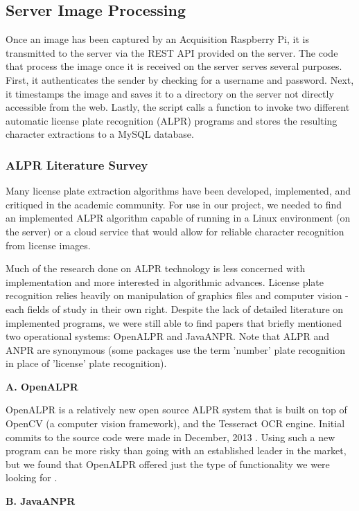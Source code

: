 \documentclass[11pt, oneside, fullpage, doublespace]{article}
\begin{document}
\subsection{Server Image Processing}
Once an image has been captured by an Acquisition Raspberry Pi, it is transmitted to the server via the REST API provided on the server. The code that process the image once it is received on the server serves several purposes. First, it authenticates the sender by checking for a username and password. Next, it timestamps the image and saves it to a directory on the server not directly accessible from the web. Lastly, the script calls a function to invoke two different automatic license plate recognition (ALPR) programs and stores the resulting character extractions to a MySQL database.

\subsubsection{ALPR Literature Survey}
Many license plate extraction algorithms have been developed, implemented, and critiqued in the academic community. For use in our project, we needed to find an implemented ALPR algorithm capable of running in a Linux environment (on the server) or a cloud service that would allow for reliable character recognition from license images.

Much of the research done on ALPR technology is less concerned with implementation and more interested in algorithmic advances. License plate recognition relies heavily on manipulation of graphics files and computer vision - each fields of study in their own right. Despite the lack of detailed literature on implemented programs, we were still able to find papers that briefly mentioned two operational systems: OpenALPR and JavaANPR. Note that ALPR and ANPR are synonymous (some packages use the term 'number' plate recognition in place of 'license' plate recognition).

\textbf{A. OpenALPR}

OpenALPR is a relatively new open source ALPR system that is built on top of OpenCV (a computer vision framework), and the Tesseract OCR engine. Initial commits to the source code were made in December, 2013 \cite{trainocr}. Using such a new program can be more risky than going with an established leader in the market, but we found that OpenALPR offered just the type of functionality we were looking for \cite{openalpr}.

\textbf{B. JavaANPR}
\end{document}
